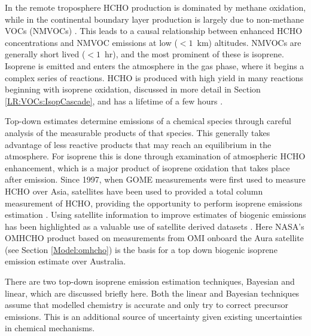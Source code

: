    In the remote troposphere HCHO production is dominated by methane oxidation, while in the continental boundary layer production is largely due to non-methane VOCs (NMVOCs) \parencite{Abbot2003, Kefauver2014}.
    This leads to a causal relationship between enhanced HCHO concentrations and NMVOC emissions at low ($<1$~km) altitudes.
    NMVOCs are generally short lived ($<1$~hr), and the most prominent of these is isoprene.
    Isoprene is emitted and enters the atmosphere in the gas phase, where it begins a complex series of reactions.
    HCHO is produced with high yield in many reactions beginning with isoprene oxidation, discussed in more detail in Section \ref{LR:VOCs:IsopCascade}, and has a lifetime of a few hours \parencite{Kefauver2014}.
    
    Top-down estimates determine emissions of a chemical species through careful analysis of the measurable products of that species.
    This generally takes advantage of less reactive products that may reach an equilibrium in the atmosphere.
    For isoprene this is done through examination of atmospheric HCHO enhancement, which is a major product of isoprene oxidation that takes place after emission.
    Since 1997, when GOME measurements were first used to measure HCHO over Asia, satellites have been used to provided a total column measurement of HCHO, providing the opportunity to perform isoprene emissions estimation \parencite{Thomas1998,Palmer2001,Bauwens2016}.
    Using satellite information to improve estimates of biogenic emissions has been highlighted as a valuable use of satellite derived datasets \parencite{Streets2013}.
    Here NASA's OMHCHO product based on measurements from OMI onboard the Aura satellite (see Section \ref{Model:omhcho}) is the basis for a top down biogenic isoprene emission estimate over Australia.
    
    There are two top-down isoprene emission estimation techniques, Bayesian and linear, which are discussed briefly here.
    Both the linear and Bayesian techniques assume that modelled chemistry is accurate and only try to correct precursor emissions.
    This is an additional source of uncertainty given existing uncertainties in chemical mechanisms.
    
